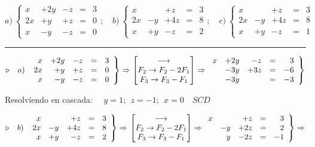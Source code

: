 \begin{miejercicio}

\begin{small}
$a)\ \left\{
\begin{array}{rrrcr}
     x & + 2y & -z & = & 3 
  \\ 2x & + y & +z & = & 0
  \\  x &  -y & -z & = & 0
\end{array}
\right.;\quad 
b)\ \left\{
\begin{array}{rrrcr}
     x & & +z & = & 3 
  \\ 2x& -y& +4z & = & 8
  \\ x& +y &-z & = & 2
\end{array}
\right.;\quad 
c)\ \left\{
\begin{array}{rrrcr}
     x & & +z & = & 3 
  \\ 2x& -y& +4z & = & 8
  \\ x& +y &-z & = & 1
\end{array}
\right.$
\end{small}

\rule{250pt}{0.1pt}

\vspace{5mm} $\triangleright \quad a)\ \left.
\begin{array}{rrrcr}
     x & + 2y & -z & = & 3 
  \\ 2x & + y & +z & = & 0
  \\  x &  -y & -z & = & 0
\end{array}
\right\} \Rightarrow \mqty[\longrightarrow \\ F_2\to F_2-2F_1 \\ F_3\to F_3-F_1 ] \Rightarrow 
\left.
\begin{array}{rrrcr}
   x&+2y&-z&=&3 \\
    &-3y & +3z&=&	-6 \\
    & -3y & & = & -3
\end{array}
\right\}
$

\vspace{2mm} Resolviendo en cascada: $\quad y=1;\ \ z=-1;\ \ x=0\quad SCD$

\vspace{8mm} $\triangleright \quad  b)\ \left.
\begin{array}{rrrcr}
     x & & +z & = & 3 
  \\ 2x& -y& +4z & = & 8
  \\ x& +y &-z & = & 2
\end{array}
\right\}
\Rightarrow
\left.
\mqty[ \longrightarrow \\ F_2\to F_2-2F_1 \\ F_3\to F_3-F_1  ] \Rightarrow 
\begin{array}{rrrcr}
	x&&+z&=&3\\
	&-y&+2z&=&2 \\
	&y&-2z&=&-1	
\end{array}
\right\} \Rightarrow
$


\end{miejercicio}
